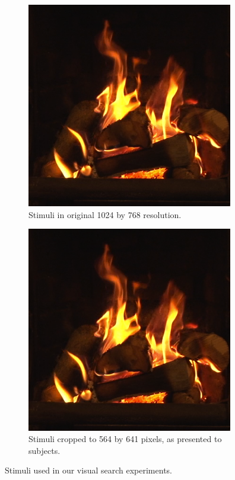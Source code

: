 \begin{figure}[htp]
\centering

\begin{subfigure}[b]{\textwidth}
\centering
                \includegraphics[width=9cm]{img/frame00000-norm.png}
                \caption{Stimuli in original 1024 by 768 resolution.}
          
        \end{subfigure}

\begin{subfigure}[b]{\textwidth}
\centering
                \includegraphics[width=9cm]{img/frame00000-norm.png}
                \caption{Stimuli cropped to 564 by 641 pixels, as presented to subjects.}
          
        \end{subfigure}

\caption{Stimuli used in our visual search experiments.}
\end{figure}

